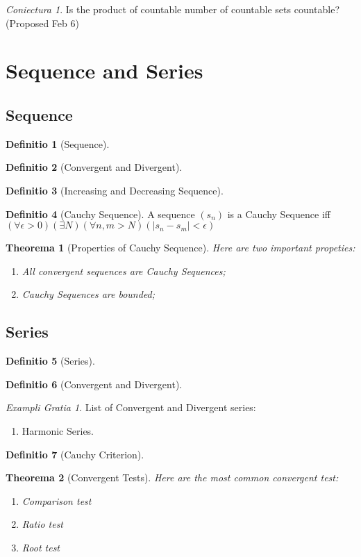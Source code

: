 \documentclass[12pt, a4paper]{report}
\newtheorem{theorem}{Theorema}[section]
\theoremstyle{definition}
\newtheorem{definition}{Definitio}[section]
\theoremstyle{definition}
\theoremstyle{remark}
\newtheorem{hypothesis}{Coniectura}[section]
\newtheorem{example}{Exampli Gratia}[section]
\begin{document}
\begin{hypothesis}
Is the product of countable number of countable sets countable? (Proposed Feb 6)
\end{hypothesis}

\section{Sequence and Series}
\subsection{Sequence}
\begin{definition}[Sequence]
\end{definition}

\begin{definition}[Convergent and Divergent]
\end{definition}

\begin{definition}[Increasing and Decreasing Sequence]
\end{definition}

\begin{definition}[Cauchy Sequence]\cite{Ross}
	A sequence $(s_n)$ is a Cauchy Sequence iff $(\forall \epsilon > 0)(\exists N)(\forall n,m>N)(|s_n-s_m|<\epsilon)$
\end{definition}
\begin{theorem}[Properties of Cauchy Sequence]
Here are two important propeties:
\begin{enumerate}
	\item All convergent sequences are Cauchy Sequences;
	\item Cauchy Sequences are bounded;
\end{enumerate}
\end{theorem}

\subsection{Series}
\begin{definition}[Series]
\end{definition}
\begin{definition}[Convergent and Divergent]
\end{definition}
\begin{example}
List of Convergent and Divergent series:
\begin{enumerate}
	\item Harmonic Series.
\end{enumerate}
\end{example}
\begin{definition}[Cauchy Criterion]
\end{definition}
\begin{theorem}[Convergent Tests]
Here are the most common convergent test:
\begin{enumerate}
	\item Comparison test
	\item Ratio test
	\item Root test
\end{enumerate}
\end{theorem}
\end{document}
